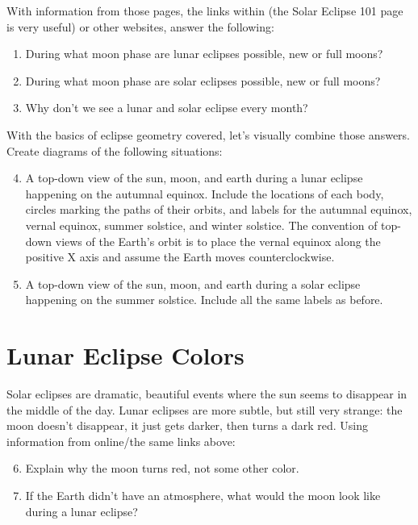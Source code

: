 \documentclass[11pt]{article}
\begin{document}
With information from those pages, the links within (the Solar Eclipse 101 page is very useful) or other websites, answer the following:
\begin{enumerate}
    \item During what moon phase are lunar eclipses possible, new or full moons?
    \item During what moon phase are solar eclipses possible, new or full moons?
    \item Why don't we see a lunar and solar eclipse every month?
\end{enumerate}


\noindent With the basics of eclipse geometry covered, let's visually combine those answers. Create diagrams of the following situations:
\begin{enumerate}
    \setcounter{enumi}{3}
    \item A top-down view of the sun, moon, and earth during a lunar eclipse happening on the autumnal equinox. Include the locations of each body, circles marking the paths of their orbits, and labels for the autumnal equinox, vernal equinox, summer solstice, and winter solstice. The convention of top-down views of the Earth's orbit is to place the vernal equinox along the positive X axis and assume the Earth moves counterclockwise. 
    \item A top-down view of the sun, moon, and earth during a solar eclipse happening on the summer solstice. Include all the same labels as before.
\end{enumerate}

\section{Lunar Eclipse Colors}
Solar eclipses are dramatic, beautiful events where the sun seems to disappear in the middle of the day. Lunar eclipses are more subtle, but still very strange: the moon doesn't disappear, it just gets darker, then turns a dark red. Using information from online/the same links above:
\begin{enumerate}
    \setcounter{enumi}{5}
    \item Explain why the moon turns red, not some other color.
    \item If the Earth didn't have an atmosphere, what would the moon look like during a lunar eclipse?
\end{enumerate}
\end{document}
